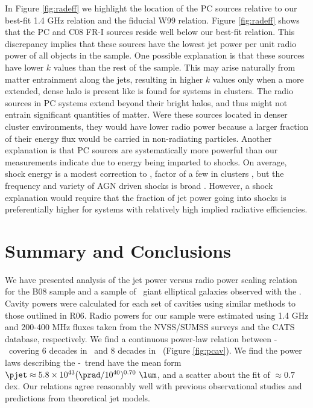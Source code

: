 \documentclass{emulateapj}
\begin{document}
In Figure \ref{fig:radeff} we highlight the location of the PC sources
relative to our best-fit 1.4 GHz relation and the fiducial W99
relation. Figure \ref{fig:radeff} shows that the PC and C08 FR-I
sources reside well below our best-fit relation. This discrepancy
implies that these sources have the lowest jet power per unit radio
power of all objects in the sample. One possible explanation is that
these sources have lower $k$ values than the rest of the sample. This
may arise naturally from matter entrainment along the jets, resulting
in higher $k$ values only when a more extended, dense halo is present
like is found for systems in clusters. The radio sources in PC systems
extend beyond their bright halos, and thus might not entrain
significant quantities of matter. Were these sources located in denser
cluster environments, they would have lower radio power because a
larger fraction of their energy flux would be carried in non-radiating
particles. Another explanation is that PC sources are systematically
more powerful than our measurements indicate due to energy being
imparted to shocks. On average, shock energy is a modest correction to
\pcav, factor of a few in clusters \citep{mcnamrev}, but the frequency
and variety of AGN driven shocks is broad
\citep[\eg][]{2003ApJ...592..129K, hydraa, herca,
  2003ApJ...592..129K}. However, a shock explanation would require
that the fraction of jet power going into shocks is preferentially
higher for systems with relatively high implied radiative
efficiencies.

\section{Summary and Conclusions}
\label{sec:summary}

We have presented analysis of the jet power versus radio power scaling
relation for the B08 sample and a sample of \samp\ giant elliptical
galaxies observed with the \cxo. Cavity powers were calculated for
each set of cavities using similar methods to those outlined in
R06. Radio powers for our sample were estimated using 1.4 GHz and
200-400 MHz fluxes taken from the NVSS/SUMSS surveys and the CATS
database, respectively. We find a continuous power-law relation
between \pjet-\prad\ covering 6 decades in \prad\ and 8 decades in
\pjet\ (Figure \ref{fig:pcav}). We find the power laws describing the
\pjet-\prad\ trend have the mean form $\pjet \approx 5.8 \times
10^{43} (\prad/10^{40})^{0.70} ~\lum$, and a scatter about the fit of
$\approx 0.7$ dex. Our relations agree reasonably well with previous
observational studies and predictions from theoretical jet models.
\end{document}
